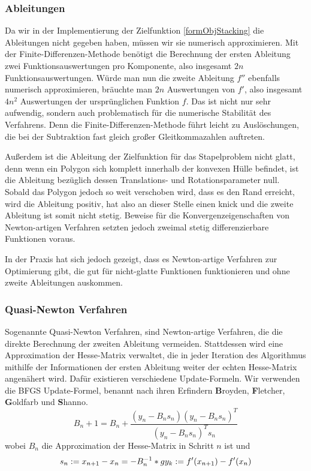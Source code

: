 \documentclass[runningheads,a4paper]{llncs}
\begin{document}
\subsubsection{Ableitungen}

Da wir in der Implementierung der Zielfunktion \ref{formObjStacking} die Ableitungen nicht gegeben haben, müssen wir sie numerisch approximieren. Mit der Finite-Differenzen-Methode benötigt die Berechnung der ersten Ableitung zwei Funktionsauswertungen pro Komponente, also insgesamt $2n$ Funktionsauswertungen. Würde man nun die zweite Ableitung $f''$ ebenfalls numerisch approximieren, bräuchte man $2n$ Auswertungen von $f'$, also insgesamt $4n^2$ Auswertungen der ursprünglichen Funktion $f$. Das ist nicht nur sehr aufwendig, sondern auch problematisch für die numerische Stabilität des Verfahrens. Denn die Finite-Differenzen-Methode führt leicht zu Auslöschungen, die bei der Subtraktion fast gleich großer Gleitkommazahlen auftreten.

Außerdem ist die Ableitung der Zielfunktion für das Stapelproblem nicht glatt, denn wenn ein Polygon sich komplett innerhalb der konvexen Hülle befindet, ist die Ableitung bezüglich dessen Translations- und Rotationsparameter null. Sobald das Polygon jedoch so weit verschoben wird, dass es den Rand erreicht, wird die Ableitung positiv, hat also an dieser Stelle einen knick und die zweite Ableitung ist somit nicht stetig. Beweise für die Konvergenzeigenschaften von Newton-artigen Verfahren setzten jedoch zweimal stetig differenzierbare Funktionen voraus.

In der Praxis hat sich jedoch gezeigt, dass es Newton-artige Verfahren zur Optimierung gibt, die gut für nicht-glatte Funktionen funktionieren \cite{DBLP:journals/mp/LewisO13} und ohne zweite Ableitungen auskommen.

\subsubsection{Quasi-Newton Verfahren}

Sogenannte Quasi-Newton Verfahren, sind Newton-artige Verfahren, die die direkte Berechnung der zweiten Ableitung vermeiden. Stattdessen wird eine Approximation der Hesse-Matrix verwaltet, die in jeder Iteration des Algorithmus mithilfe der Informationen der ersten Ableitung weiter der echten Hesse-Matrix angenähert wird. Dafür existieren verschiedene Update-Formeln. Wir verwenden die BFGS Update-Formel, benannt nach ihren Erfindern \textbf{B}royden, \textbf{F}letcher, \textbf{G}oldfarb und \textbf{S}hanno. \cite{nocedal1999numerical}
\begin{equation*}
B_n+1 = B_n + \frac{(y_n- B_ns_n) (y_n-B_ns_n)^T}{(y_n- B_n s_n)^T s_n}
\end{equation*}
wobei $B_n$ die Approximation der Hesse-Matrix in Schritt $n$ ist und
\begin{equation*}
s_n := x_{n+1} - x_n = -B_n^{-1}*g\\
y_k := f'(x_{n+1}) - f'(x_n)
\end{equation*}
\end{document}
